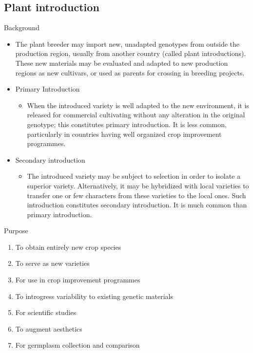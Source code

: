 \documentclass[ignorenonframetext,aspectratio=169]{beamer}
\providecommand{\tightlist}{%
  \setlength{\itemsep}{0pt}\setlength{\parskip}{0pt}}
\begin{document}
\hypertarget{plant-introduction}{%
\subsection{Plant introduction}\label{plant-introduction}}

\begin{frame}{Background}
\protect\hypertarget{background-1}{}

\begin{itemize}
\item
  The plant breeder may import new, unadapted genotypes from outside the
  production region, usually from another country (called plant
  introductions). These new materials may be evaluated and adapted to
  new production regions as new cultivars, or used as parents for
  crossing in breeding projects.
\item
  Primary Introduction

  \begin{itemize}
  \tightlist
  \item
    When the introduced variety is well adapted to the new environment,
    it is released for commercial cultivating without any alteration in
    the original genotype; this constitutes primary introduction. It is
    less common, particularly in countries having well organized crop
    improvement programmes.
  \end{itemize}
\item
  Secondary introduction

  \begin{itemize}
  \tightlist
  \item
    The introduced variety may be subject to selection in order to
    isolate a superior variety. Alternatively, it may be hybridized with
    local varieties to transfer one or few characters from these
    varieties to the local ones. Such introduction constitutes secondary
    introduction. It is much common than primary introduction.
  \end{itemize}
\end{itemize}

\end{frame}

\begin{frame}{Purpose}
\protect\hypertarget{purpose}{}

\begin{enumerate}
\tightlist
\item
  To obtain entirely new crop species
\item
  To serve as new varieties
\item
  For use in crop improvement programmes
\item
  To introgress variability to existing genetic materials
\item
  For scientific studies
\item
  To augment aesthetics
\item
  For germplasm collection and comparison
\end{enumerate}

\end{frame}
\end{document}
